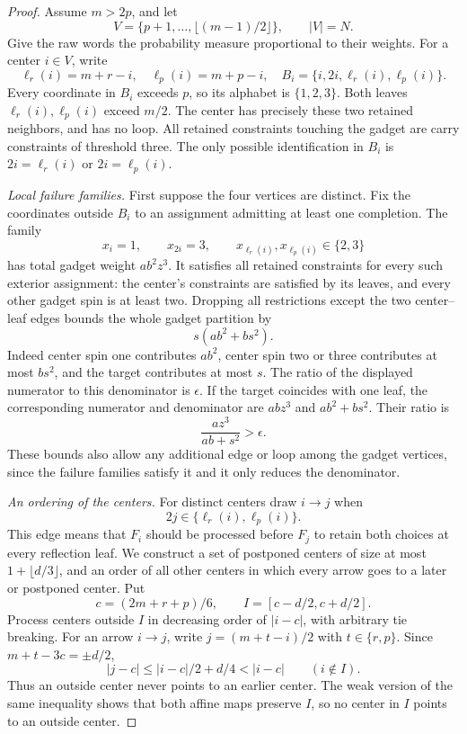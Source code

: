 \documentclass[11pt]{amsart}
\theoremstyle{definition}
\theoremstyle{remark}
\numberwithin{equation}{section}
\begin{document}
\begin{proof}
Assume $m>2p$, and let
\[
 V=\{p+1,\ldots,\lfloor(m-1)/2\rfloor\},\qquad |V|=N.
\]
Give the raw words the probability measure proportional to their weights.
For a center $i\in V$, write
\[
 \ell_r(i)=m+r-i,\quad \ell_p(i)=m+p-i,\quad
 B_i=\{i,2i,\ell_r(i),\ell_p(i)\}.
\]
Every coordinate in $B_i$ exceeds $p$, so its alphabet is
$\{1,2,3\}$. Both leaves $\ell_r(i),\ell_p(i)$ exceed $m/2$.
The center has precisely these two retained neighbors, and has no loop.
All retained constraints touching the gadget are carry constraints of
threshold three. The only possible identification in $B_i$ is
$2i=\ell_r(i)$ or $2i=\ell_p(i)$.

\emph{Local failure families.}
First suppose the four vertices are distinct. Fix the coordinates outside
$B_i$ to an assignment admitting at least one completion. The family
\[
 x_i=1,\qquad x_{2i}=3,\qquad
 x_{\ell_r(i)},x_{\ell_p(i)}\in\{2,3\}
\]
has total gadget weight $ab^2z^3$. It satisfies all retained constraints
for every such exterior assignment: the center's constraints are
satisfied by its leaves, and every other gadget spin is at least two.
Dropping all restrictions except the two center--leaf edges bounds the
whole gadget partition by
\[
 s(ab^2+bs^2).
\]
Indeed center spin one contributes $ab^2$, center spin two or three
contributes at most $bs^2$, and the target contributes at most $s$.
The ratio of the displayed numerator to this denominator is $\epsilon$.
If the target coincides with one leaf, the corresponding numerator and
denominator are $abz^3$ and $ab^2+bs^2$. Their ratio is
\[
 \frac{az^3}{ab+s^2}>\epsilon.
\]
These bounds also allow any additional edge or loop among the gadget
vertices, since the failure families satisfy it and it only reduces
the denominator.

\emph{An ordering of the centers.}
For distinct centers draw $i\to j$ when
\begin{equation}\label{mass:dependency}
 2j\in\{\ell_r(i),\ell_p(i)\}.
\end{equation}
This edge means that $F_i$ should be processed before $F_j$ to retain
both choices at every reflection leaf. We construct a set of postponed
centers of size at most $1+\lfloor d/3\rfloor$, and an order of all
other centers in which every arrow goes to a later or postponed center.
Put
\[
 c=(2m+r+p)/6,\qquad I=[c-d/2,c+d/2].
\]
Process centers outside $I$ in decreasing order of $|i-c|$, with
arbitrary tie breaking. For an arrow $i\to j$, write
$j=(m+t-i)/2$ with $t\in\{r,p\}$. Since $m+t-3c=\pm d/2$,
\[
 |j-c|\le |i-c|/2+d/4<|i-c|\qquad(i\notin I).
\]
Thus an outside center never points to an earlier center. The weak
version of the same inequality shows that both affine maps preserve
$I$, so no center in $I$ points to an outside center.


\end{proof}
\end{document}
